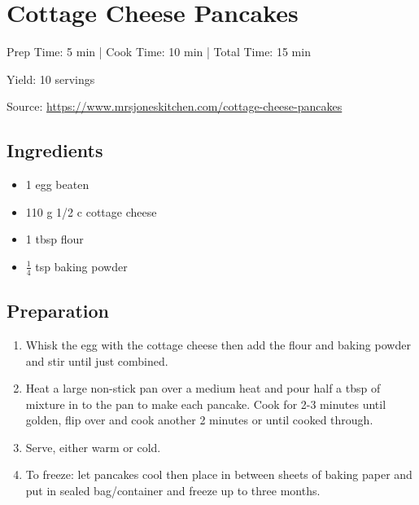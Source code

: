 \section{Cottage Cheese Pancakes}

\begin{center}
Prep Time: 5 min |
Cook Time: 10 min |
Total Time: 15 min

\noindent Yield: 10 servings

\vspace{1em}

    Source: \url{https://www.mrsjoneskitchen.com/cottage-cheese-pancakes}
\end{center}

\subsection{Ingredients}
\begin{multicols}{2}
\begin{itemize}
  \item 1 egg beaten
  \item 110 g 1/2 c cottage cheese
  \item 1 tbsp flour
  \item $\frac{1}{4}$ tsp baking powder
\end{itemize}
\end{multicols}

\subsection{Preparation}
\begin{enumerate}
  \item Whisk the egg with the cottage cheese then add the flour and baking powder and stir until just combined.
  \item Heat a large non-stick pan over a medium heat and pour half a tbsp of mixture in to the pan to make each pancake. Cook for 2-3 minutes until golden, flip over and cook another 2 minutes or until cooked through.
  \item Serve, either warm or cold.
  \item To freeze: let pancakes cool then place in between sheets of baking paper and put in sealed bag/container and freeze up to three months.
\end{enumerate}
